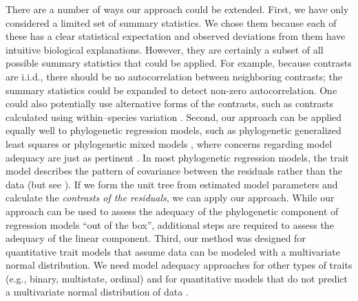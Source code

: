 \documentclass[a4paper,12pt]{article}
\begin{document}
There are a number of ways our approach could be extended. First, we have only considered a limited set of summary statistics. We chose them because each of these has a clear statistical expectation and observed deviations from them have intuitive biological explanations. However, they are certainly a subset of all possible summary statistics that could be applied. 
For example, because contrasts are i.i.d., there should be no autocorrelation between neighboring contrasts; the summary statistics could be expanded to detect non-zero autocorrelation.
One could also potentially use alternative forms of the contrasts, such as contrasts calculated using within--species variation \citep{Felsenstein2008}. Second, our approach can be applied equally well to phylogenetic regression models, such as phylogenetic generalized least squares \citep{Grafen1989} or phylogenetic mixed models \citep{Lynch1991, Hadfield2010}, where concerns regarding model adequacy are just as pertinent \citep{Hansen2012}. In most phylogenetic regression models, the trait model describes the pattern of covariance between the residuals rather than the data \citep{Rohlf2001, Rohlf2006} (but see \citep{Hansen2008}). If we form the unit tree from estimated model parameters and calculate the \emph{contrasts of the residuals}, we can apply our approach. While our approach can be used to assess the adequacy of the phylogenetic component of regression models ``out of the box'', additional steps are required to assess the adequacy of the linear component. Third, our method was designed for quantitative trait models that assume data can be modeled with a multivariate normal distribution. We need model adequacy approaches for other types of traits (e.g., binary, multistate, ordinal) and for quantitative models that do not predict a multivariate normal distribution of data \citep{Landis2012}.

\end{document}
